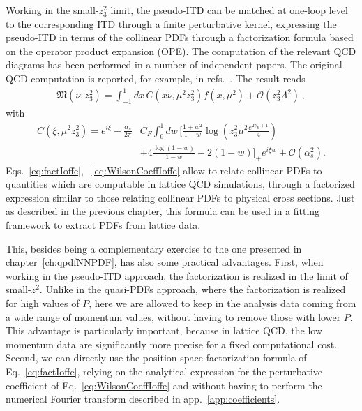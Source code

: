 Working in the small-$z_3^2$ limit, the pseudo-ITD can be matched at one-loop level to the corresponding ITD
through a finite perturbative kernel, expressing the pseudo-ITD in terms of the collinear PDFs through a factorization formula
based on the operator product expansion (OPE).  
The computation of the relevant QCD diagrams has been performed in a number of independent papers.
The original QCD computation is reported, for example, 
in refs.~\cite{Radyushkin:2017lvu, Radyushkin:2016hsy, Izubuchi:2018srq, Ji:2017rah}.
The result reads
\begin{align}
	\label{eq:factIoffe}
	\mathfrak{M}\left(\nu, z_3^2\right) = \int_{-1}^{1} dx\,C\left(x\nu,\mu^2 z_3^2\right)f\left(x,\mu^2\right) + \mathcal{O}\left(z_3^2\Lambda^2\right)\,, 
\end{align}
with
\begin{align}
	\label{eq:WilsonCoeffIoffe}
	C\left(\xi,\mu^2 z_3^2\right) 
	= e^{i\xi} \nonumber -\frac{\alpha_s}{2\pi}& C_F \int_0^1 dw \, \biggl[\frac{1+w^2}{1-w} \log\left(z_3^2\mu^2\frac{e^{2\gamma_E + 1}}{4}\right) \nonumber \\
	&+4\frac{\log\left(1-w\right)}{1-w} -2\left(1-w\right)\biggr]_+ e^{i \xi w} + \mathcal{O}\left(\alpha_s^2\right).
\end{align}
Eqs.~\eqref{eq:factIoffe}, ~\eqref{eq:WilsonCoeffIoffe} allow to relate collinear PDFs to quantities
which are computable in lattice QCD simulations, through a factorized expression similar to those
relating collinear PDFs to physical cross sections. Just as described in the previous chapter, 
this formula can be used in a fitting framework to extract PDFs from lattice data.

This, besides being a complementary exercise to the one presented in chapter~\ref{ch:qpdfNNPDF}, has also some
practical advantages. First, when working in the pseudo-ITD approach, the factorization is realized in the limit of small-$z^2$.
Unlike in the quasi-PDFs approach, where the factorization is realized for high values of $P$,
here we are allowed to keep in the analysis data coming from a wide range of momentum values, 
without having to remove those with lower $P$.
This advantage is particularly important, because in lattice QCD, the low momentum data are significantly more precise for a fixed computational cost.
Second, we can directly use the position space factorization formula of Eq.~\eqref{eq:factIoffe}, relying on the analytical
expression for the perturbative coefficient of Eq.~\eqref{eq:WilsonCoeffIoffe} and without having
to perform the numerical Fourier transform described in app.~\ref{app:coefficients}.

